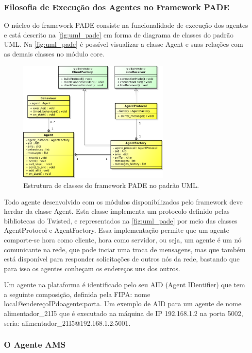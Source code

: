 \documentclass[journal]{IEEEtran}
\begin{document}
\subsubsection{Filosofia de Execução dos Agentes no Framework PADE} 

O núcleo do framework PADE consiste na funcionalidade de execução dos agentes e está descrito na \autoref{fig:uml_pade} em forma de diagrama de classes do padrão UML. Na \autoref{fig:uml_pade} é possível visualizar a classe Agent e suas relações com as demais classes no módulo core.

\begin{figure}[!htb]
    \centering
    \includegraphics[width=3.0in]{Figuras/Core.eps}
    \caption{\label{fig:uml_pade} Estrutura de classes do framework PADE no padrão UML.}
\end{figure}

Todo agente desenvolvido com os módulos disponibilizados pelo framework deve herdar da classe Agent. Esta classe implementa um protocolo definido pelas bibliotecas do Twisted, e representados na \autoref{fig:uml_pade} por meio das classes AgentProtocol e AgentFactory. Essa implementação permite que um agente comporte-se hora como cliente, hora como servidor, ou seja, um agente é um nó comunicante na rede, que pode inciar uma troca de mensagens, mas que também está disponível para responder solicitações de outros nós da rede, bastando que para isso os agentes conheçam os endereços uns dos outros.

Um agente na plataforma é identificado pelo seu AID (Agent IDentifier) que tem a seguinte composição, definida pela FIPA:  nome local@endereçoIPdoagente:porta. Um exemplo de AID para um agente de nome alimentador\_21I5 que é executado na máquina de IP 192.168.1.2 na porta 5002, seria: alimentador\_21I5@192.168.1.2:5001.

\subsubsection{O Agente AMS}
\end{document}
